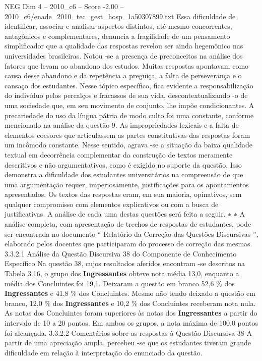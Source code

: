 \begin{textsample}{NEG Dim 4 – 2010\_c6 – Score -2.00 – 2010\_c6/enade\_2010\_tec\_gest\_hosp\_1a50307899.txt}
Essa dificuldade de identificar, associar e analisar aspectos distintos, até mesmo concorrentes, antagônicos e complementares, denuncia a fragilidade de um pensamento simplificador que a qualidade das respostas revelou ser ainda hegemônico nas universidades brasileiras.
Notou -se a presença de preconceitos na análise dos fatores que levam ao abandono dos estudos.
Muitas respostas apontavam como causa desse abandono e da repetência a preguiça, a falta de perseverança e o cansaço dos estudantes.
Nesse tópico específico, fica evidente a responsabilização do indivíduo pelos percalços e fracassos de sua vida, descontextualizando -o de uma sociedade que, em seu movimento de conjunto, lhe impõe condicionantes.
A precariedade do uso da língua pátria de modo culto foi uma constante, conforme mencionado na análise da questão 9.
As impropriedades lexicais e a falta de elementos coesores que articulassem as partes constitutivas das respostas foram um incômodo constante.
Nesse sentido, agrava -se a situação da baixa qualidade textual em decorrência complementar da construção de textos meramente descritivos e não argumentativos, como é exigido no suporte da questão.
Isso demonstra a dificuldade dos estudantes universitários na compreensão de que uma argumentação requer, imperiosamente, justificações para os apontamentos apresentados.
Os textos das respostas eram, em sua maioria, opinativos, sem qualquer compromisso com elementos explicativos ou com a busca de justificativas.
A análise de cada uma destas questões será feita a seguir. ∗ ∗ A análise completa, com apresentação de trechos de respostas de estudantes, pode ser encontrada no documento “ Relatório da Correção das Questões Discursivas ”, elaborado pelos docentes que participaram do processo de correção das mesmas. 3.3.2.1 Análise da Questão Discursiva 38 do Componente de Conhecimento Específico Na questão 38, cujos resultados aferidos encontram -se descritos na Tabela 3.16, o grupo dos \textbf{Ingressantes} obteve nota média 13,0, enquanto a média dos Concluintes foi 19,1.
Deixaram a questão em branco 52,6 \% dos \textbf{Ingressantes} e 41,8 \% dos Concluintes.
Mesmo não tendo deixado a questão em branco, 12,0 \% dos \textbf{Ingressantes} e 10,2 \% dos Concluintes receberam nota nula.
As notas dos Concluintes foram superiores às notas dos \textbf{Ingressantes} a partir do intervalo de 10 a 20 pontos.
Em ambos os grupos, a nota máxima de 100,0 pontos foi alcançada. 3.3.2.2 Comentários sobre as respostas à Questão Discursiva 38 A partir de uma apreciação ampla, percebeu -se que os estudantes tiveram grande dificuldade em relação à interpretação do enunciado da questão.

\end{textsample}
